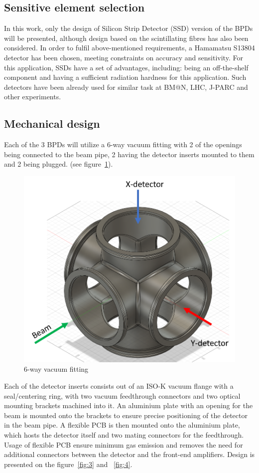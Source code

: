 \documentclass[a4paper]{jpconf}
\begin{document}
\subsection{Sensitive element selection}
In this work, only the design of Silicon Strip Detector (SSD) version of the BPDs will be presented, although design based on the scintillating fibres has also been considered.
In order to fulfil above-mentioned requirements, a Hamamatsu S13804 detector has been chosen, meeting constraints on accuracy and sensitivity.
For this application, SSDs have a set of advantages, including: being an off-the-shelf component and having a sufficient radiation hardness for this application. Such detectors have been already used for similar task at BM@N, LHC, J-PARC and other experiments.

\subsection{Mechanical design}
Each of the 3 BPDs will utilize a 6-way vacuum fitting with 2 of the openings being connected to the beam pipe, 2 having the detector inserts mounted to them and 2 being plugged. (see figure~\ref{fig:2}).

\begin{figure}[htbp]
	\centering
	\includegraphics[width=.5\textwidth]{6_way_fitting.png}
	\caption{\label{fig:2} 6-way vacuum fitting}
\end{figure}

Each of the detector inserts consists out of an ISO-K vacuum flange with a seal/centering ring, with two vacuum feedthrough connectors and two optical mounting brackets machined into it. An aluminium plate with an opening for the beam is mounted onto the brackets to ensure precise positioning of the detector in the beam pipe. A flexible PCB is then mounted onto the aluminium plate, which hosts the detector itself and two mating connectors for the feedthrough. Usage of flexible PCB ensure minimum gas emission and removes the need for additional connectors between the detector and the front-end amplifiers. Design is presented on the figure~\ref{fig:3} and ~\ref{fig:4}.
\end{document}
